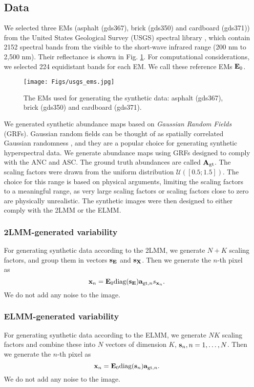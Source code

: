 \subsection{Data}
We selected three EMs (asphalt (gds367), brick (gds350) and cardboard (gds371)) from the United States Geological Survey (USGS) spectral library \cite{kokaly_usgs_2017}, which contain 2152 spectral bands from the visible to the short-wave infrared range (200 nm to 2,500 nm). Their reflectance is shown in Fig. \ref{fig: usgs ems}.  For  computational considerations, we selected 224 equidistant bands for each EM. We call these reference EMs $\mathbf{E}_0$.

\begin{figure}[t]
    \centering
    \texttt{[image: Figs/usgs\_ems.jpg]}
    \caption{The EMs used for generating the synthetic data: asphalt (gds367), brick (gds350) and cardboard (gds371).}
    \label{fig: usgs ems}
\end{figure}

We generated synthetic abundance maps based on \emph{Gaussian Random Fields} (GRFs). Gaussian random fields can be thought of as spatially correlated Gaussian randomness \cite{kozintsev_computations_1999, noauthor_hyperspectral_nodate}, and they are a popular choice for generating synthetic hyperspectral data. We generate abundance maps using GRFs designed to comply with the ANC and ASC. The ground truth abundances are called $\mathbf{A}_\mathrm{gt}$. The scaling factors were drawn from the uniform distribution $\mathcal{U}([0.5; 1.5])$. The choice for this range is based on physical arguments, limiting the scaling factors to a meaningful range, as very large scaling factors or scaling factors close to zero are physically unrealistic.  The synthetic images were then designed to either comply with the 2LMM or the ELMM.

\subsubsection{2LMM-generated variability}
For generating synthetic data according to the 2LMM, we generate $N + K$ scaling factors, and group them in vectors $\mathbf{s}_{\mathbf{E}}$ and $\mathbf{s}_{\mathbf{X}}$. Then we generate the $n$-th pixel as
\[
\mathbf{x}_n = \mathbf{E}_0 \mathrm{diag}(\mathbf{s}_{\mathbf{E}}) \mathbf{a}_{\mathrm{gt}, n} s_{\mathbf{x}_n}.
\]
We do not add any noise to the image.

\subsubsection{ELMM-generated variability}
For generating synthetic data according to the ELMM, we generate $NK$ scaling factors and combine these into $N$ vectors of dimension $K$, $\mathbf{s}_n, n=1,\ldots, N$. Then we generate the $n$-th pixel as
\[
\mathbf{x}_n = \mathbf{E}_0 \mathrm{diag}(\mathbf{s}_n) \mathbf{a}_{\mathrm{gt}, n}.
\]
We do not add any noise to the image.


